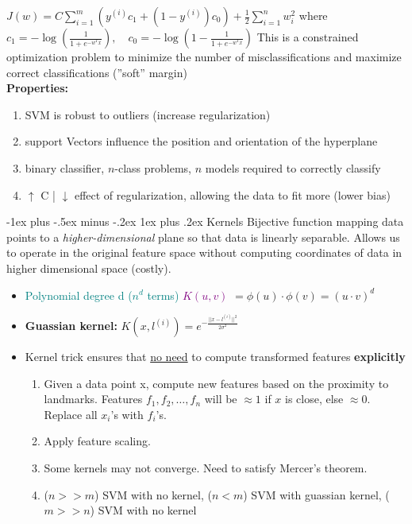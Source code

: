\documentclass[10pt,landscape]{article}
\makeatletter
\renewcommand{\subsubsection}{\@startsection{subsubsection}{3}{0mm}%
                                {-1ex plus -.5ex minus -.2ex}%
                                {1ex plus .2ex}%
                                {\normalfont\small\bfseries}}
\makeatother
\begin{document}
\begin{multicols*}{3}
$J(w) = C \sum_{i=1}^{m} \left( y^{(i)} c_1 + (1 - y^{(i)}) c_0 \right) + \frac{1}{2} \sum_{i=1}^{n} w_i^2$
where
$c_1 = -\log \left( \frac{1}{1 + e^{-w^T x}} \right), \quad c_0 = -\log \left( 1 - \frac{1}{1 + e^{-w^T x}} \right)$
This is a constrained optimization problem to minimize the number of misclassifications and maximize correct classifications (”soft” margin) \\ 
\textbf{Properties:}
\begin{enumerate}[topsep=0pt,noitemsep,wide=0pt, leftmargin=\dimexpr\labelwidth + 2\labelsep\relax]
  \item SVM is robust to outliers (increase regularization)
  \item support Vectors influence the position and orientation of the hyperplane
  \item binary classifier, $n$-class problems, $n$ models required to correctly classify
  \item $\uparrow$ C | $\downarrow$ effect of regularization, allowing the data to fit more (lower bias)
\end{enumerate}

\subsubsection{Kernels}
Bijective function mapping data points to a \textit{higher-dimensional} plane so that data is linearly separable. Allows us to operate in the original feature space without computing coordinates of data in higher dimensional space (costly).
\begin{itemize}[topsep=0pt,noitemsep,wide=0pt, leftmargin=\dimexpr{} + 2\relax]
  \item \textcolor{teal}{Polynomial degree d ($n^d$ terms)} \textcolor{purple}{$K(u,v)$} $ = \phi(u) \cdot \phi(v) = (u\cdot v)^d$
  \item \textbf{Guassian kernel:} $K(x, l^(i)) = e^{-\frac{||x-l^{(i)}||^2}{2\sigma^2}}$
  \item Kernel trick ensures that \underline{no need} to compute transformed features \textbf{explicitly}
  \begin{enumerate}[topsep=0pt,noitemsep,wide=0pt, leftmargin=\dimexpr\labelwidth + 2\labelsep\relax]
    \item Given a data point x, compute new features based on the proximity to landmarks. Features $f_1, f_2, \ldots , f_n$ will be $\approx 1$ if $x$ is close, else $\approx 0$. Replace all $x_i$’s with $f_i$’s.
    \item Apply feature scaling.
    \item Some kernels may not converge. Need to satisfy Mercer’s theorem.
    \item ($n >> m$) SVM with no kernel, ($n < m$) SVM with guassian kernel, ($m >> n$) SVM with no kernel
  \end{enumerate}
\end{itemize}


\end{multicols*}
\end{document}
